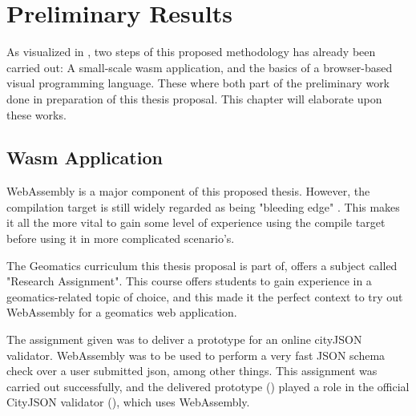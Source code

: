 

\section{Preliminary Results}
\label{sec:preliminary}

As visualized in , two steps of this proposed methodology has already been carried out: A small-scale wasm application, and the basics of a browser-based visual programming language. These where both part of the preliminary work done in preparation of this thesis proposal. This chapter will elaborate upon these works.


\subsection{Wasm Application}
\label{sec:preliminary-wasm}

WebAssembly is a major component of this proposed thesis. However, the compilation target is still widely regarded as being "bleeding edge" \cite{jangda_not_2019}. This makes it all the more vital to gain some level of experience using the compile target before using it in more complicated scenario's. 

The Geomatics curriculum this thesis proposal is part of, offers a subject called "Research Assignment". This course offers students to gain experience in a geomatics-related topic of choice, and this made it the perfect context to try out WebAssembly for a geomatics web application.

The assignment given was to deliver a prototype for an online cityJSON validator. 
WebAssembly was to be used to perform a very fast JSON schema check over a user submitted json, among other things. 
This assignment was carried out successfully, and the delivered prototype () played a role in the official CityJSON validator (), which uses WebAssembly. 

